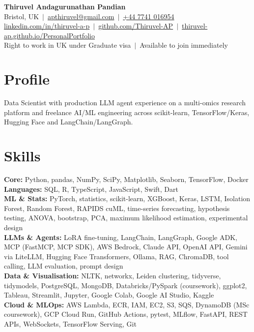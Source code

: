 \documentclass[a4paper,11pt]{article}
\begin{document}
\fontsize{11}{13.2}\selectfont

\begin{center}
  {\LARGE\bfseries Thiruvel Andagurunathan Pandian}\\[3pt]
  Bristol, UK \,$|$\, \href{mailto:apthiruvel@gmail.com}{apthiruvel@gmail.com} \,$|$\, \href{tel:+447741016954}{+44 7741 016954}\\[1pt]
\href{https://www.linkedin.com/in/thiruvel-a-p/}{linkedin.com/in/thiruvel-a-p} \,$|$\, \href{https://github.com/Thiruvel-AP}{github.com/Thiruvel-AP} \,$|$\, \href{https://thiruvel-ap.github.io/PersonalPortfolio/}{thiruvel-ap.github.io/PersonalPortfolio}\\[1pt]
  Right to work in UK under Graduate visa \,$|$\, Available to join immediately
\end{center}

\section{Profile}
Data Scientist with production LLM agent experience on a multi-omics research platform and freelance AI/ML engineering across scikit-learn, TensorFlow/Keras, Hugging Face and LangChain/LangGraph.

\section{Skills}
\textbf{Core:} Python, pandas, NumPy, SciPy, Matplotlib, Seaborn, TensorFlow, Docker\\[2pt]
\textbf{Languages:} SQL, R, TypeScript, JavaScript, Swift, Dart\\[2pt]
\textbf{ML \& Stats:} PyTorch, statistics, scikit-learn, XGBoost, Keras, LSTM, Isolation Forest, Random Forest, RAPIDS cuML, time-series forecasting, hypothesis testing, ANOVA, bootstrap, PCA, maximum likelihood estimation, experimental design\\[2pt]
\textbf{LLMs \& Agents:} LoRA fine-tuning, LangChain, LangGraph, Google ADK, MCP (FastMCP, MCP SDK), AWS Bedrock, Claude API, OpenAI API, Gemini via LiteLLM, Hugging Face Transformers, Ollama, RAG, ChromaDB, tool calling, LLM evaluation, prompt design\\[2pt]
\textbf{Data \& Visualisation:} NLTK, networkx, Leiden clustering, tidyverse, tidymodels, PostgreSQL, MongoDB, Databricks/PySpark (coursework), ggplot2, Tableau, Streamlit, Jupyter, Google Colab, Google AI Studio, Kaggle\\[2pt]
\textbf{Cloud \& MLOps:} AWS Lambda, ECR, IAM, EC2, S3, SQS, DynamoDB (MSc coursework), GCP Cloud Run, GitHub Actions, pytest, MLflow, FastAPI, REST APIs, WebSockets, TensorFlow Serving, Git
\end{document}
